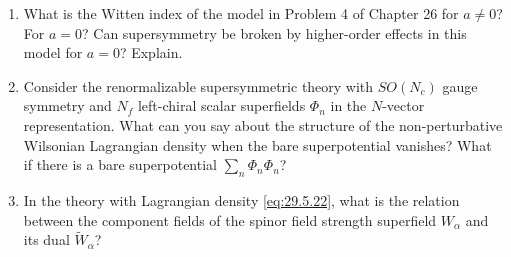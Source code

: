 

\begin{enumerate}
  \item What is the Witten index of the model in Problem 4 of Chapter 26
  for $a\ne 0$? For $a=0$? Can supersymmetry be broken by higher-order
  effects in this model for $a=0$? Explain.

  \item Consider the renormalizable supersymmetric theory with
  $SO(N_c)$ gauge symmetry and $N_f$ left-chiral scalar superfields
  $\Phi_n$ in the $N$-vector representation. What can you say about the
  structure of the non-perturbative Wilsonian Lagrangian density when
  the bare superpotential vanishes? What if there is a bare
  superpotential $\sum_n\Phi_n\Phi_n$?

  \item In the theory with Lagrangian density \eqref{eq:29.5.22}, what
  is the relation between the component fields of the spinor field
  strength superfield $W_\alpha$ and its dual
  $\widetilde W_\alpha$?
\end{enumerate}


